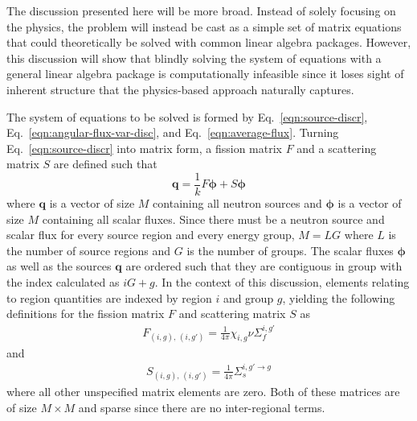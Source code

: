 The discussion presented here will be more broad. Instead of solely focusing on the physics, the problem will instead be cast as a simple set of matrix equations that could theoretically be solved with common linear algebra packages. However, this discussion will show that blindly solving the system of equations with a general linear algebra package is computationally infeasible since it loses sight of inherent structure that the physics-based approach naturally captures.

The system of equations to be solved is formed by Eq.~\ref{eqn:source-discr}, Eq.~\ref{eqn:angular-flux-var-disc}, and Eq.~\ref{eqn:average-flux}. Turning Eq.~\ref{eqn:source-discr} into matrix form, a fission matrix $F$ and a scattering matrix $S$ are defined such that
\begin{equation}
\mathbf{q} = \frac{1}{k} F \boldsymbol{\phi} + S \boldsymbol{\phi}
\label{eqn:matrix-source-calc}
\end{equation}
where $\mathbf{q}$ is a vector of size $M$ containing all neutron sources and $\boldsymbol{\phi}$ is a vector of size $M$ containing all scalar fluxes. Since there must be a neutron source and scalar flux for every source region and every energy group, $M = L G$ where $L$ is the number of source regions and $G$ is the number of groups. The scalar fluxes $\boldsymbol{\phi}$ as well as the sources $\mathbf{q}$ are ordered such that they are contiguous in group with the index calculated as $i G + g$. In the context of this discussion, elements relating to region quantities are indexed by region $i$ and group $g$, yielding the following definitions for the fission matrix $F$ and scattering matrix $S$ as
\begin{eqnarray}
F_{\left(i, g\right), \, \left(i, g'\right)} = \frac{1}{4\pi} \chi_{i,g} \nu \Sigma_f^{i,g'}
\label{eqn:fission-matrix}
\end{eqnarray}
and
\begin{eqnarray}
S_{\left(i, g\right), \, \left(i, g'\right)} = \frac{1}{4\pi} \Sigma_s^{i,g' \rightarrow g}
\label{eqn:scattering-matrix}
\end{eqnarray}
where all other unspecified matrix elements are zero. Both of these matrices are of size $M \times M$ and sparse since there are no inter-regional terms.

